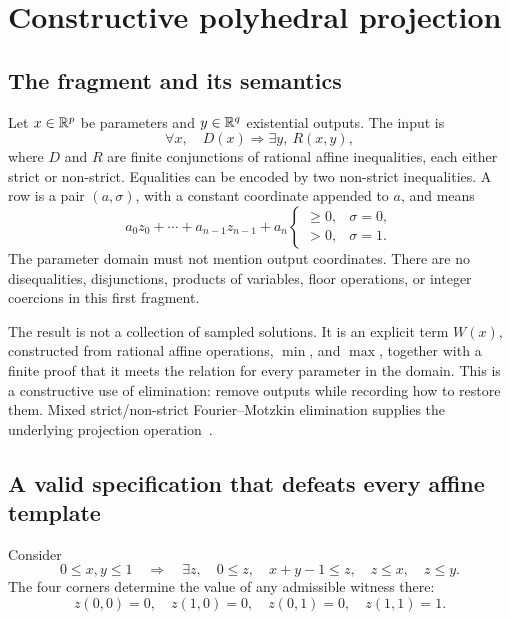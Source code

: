\section{Constructive polyhedral projection}
\label{sec:poly}

\subsection{The fragment and its semantics}
Let \(x\in\mathbb{R}^p\) be parameters and \(y\in\mathbb{R}^q\) existential outputs. The input is
\begin{equation}\label{eq:poly-goal}
 \forall x,\quad D(x)\Longrightarrow\exists y,\ R(x,y),
\end{equation}
where \(D\) and \(R\) are finite conjunctions of rational affine inequalities, each either strict or non-strict. Equalities can be encoded by two non-strict inequalities. A row is a pair \((a,\sigma)\), with a constant coordinate appended to \(a\), and means
\[
 a_0z_0+\cdots+a_{n-1}z_{n-1}+a_n
 \begin{cases}\ge0,&\sigma=0,\\>0,&\sigma=1.\end{cases}
\]
The parameter domain must not mention output coordinates. There are no disequalities, disjunctions, products of variables, floor operations, or integer coercions in this first fragment.

The result is not a collection of sampled solutions. It is an explicit term \(W(x)\), constructed from rational affine operations, \(\min\), and \(\max\), together with a finite proof that it meets the relation for every parameter in the domain. This is a constructive use of elimination: remove outputs while recording how to restore them. Mixed strict/non-strict Fourier--Motzkin elimination supplies the underlying projection operation~\cite{liepins}.

\subsection{A valid specification that defeats every affine template}
Consider
\begin{equation}\label{eq:corner}
 0\le x,y\le1\quad\Longrightarrow\quad
 \exists z,\quad 0\le z,\quad x+y-1\le z,\quad z\le x,\quad z\le y.
\end{equation}
The four corners determine the value of any admissible witness there:
\[
 z(0,0)=0,\quad z(1,0)=0,\quad z(0,1)=0,\quad z(1,1)=1.
\]

